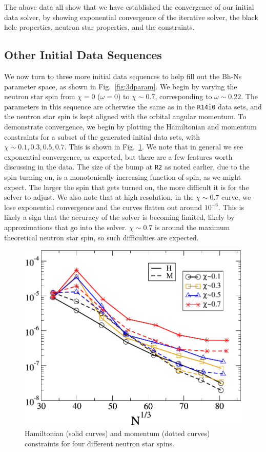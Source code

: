 The above data all show that we have established the convergence of
our initial data solver, by showing exponential convergence of the
iterative solver, the black hole properties, neutron star properties,
and the constraints.

\subsection{Other Initial Data Sequences}
We now turn to three more initial data sequences to help fill out the
Bh-Ns parameter space, as shown in Fig.~\ref{fig:3dparam}. We begin by
varying the neutron star spin from $\chi=0$ ($\omega=0$) to $\chi\sim0.7$,
corresponding to $\omega\sim0.22$. The parameters in this
sequence are otherwise the same as in the {\tt R14i0} data sets, and the neutron star spin is kept aligned with the orbital
angular momentum. To demonstrate convergence, we begin by plotting the
Hamiltonian and momentum constraints for a subset of the generated
initial data sets, with $\chi\sim{0.1,0.3,0.5,0.7}$. This is shown in
Fig.~\ref{fig:OmegaSeqHamMom}. We note that in general we see
exponential convergence, as expected, but there are a few features
worth discussing in the data. The size of the bump at {\tt R2} as noted
earlier, due to the spin turning on, is a monotonically increasing function of spin, as we might
expect. The larger the spin that gets turned on, the more difficult it
is for the solver to adjust. We also note that at high resolution, in
the $\chi\sim 0.7$ curve, we lose exponential convergence and the
curves flatten out around $10^{-6}$. This is likely a sign that the accuracy of the
solver is becoming limited, likely by approximations that go into the
solver. $\chi\sim 0.7$ is around the maximum theoretical neutron star
spin, so such difficulties are expected.

\begin{figure}
\includegraphics[width=0.95\columnwidth]{chap4/OmegaSeqHamMom}
\caption[Constraints for the $\chi_{\rm NS}$ sequence.]{\label{fig:OmegaSeqHamMom} Hamiltonian (solid curves) and
momentum (dotted curves) constraints for four different neutron star spins.}
\end{figure}

